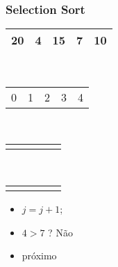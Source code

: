 \documentclass{beamer}
\begin{document}
\begin{frame}
    \frametitle{Selection Sort}
    \begin{center}
        \begin{table}
            \begin{tabular}{| p{0.25cm} | p{0.25cm} | p{0.25cm} | p{0.25cm} | p{0.25cm} |}
                \hline
                20 & 4 & 15 & 7 & 10 \\ \hline
            \end{tabular} \\
            \begin{tabular}{p{0.25cm} p{0.25cm} p{0.25cm} p{0.25cm} p{0.25cm}}
                0 & 1 & 2 & 3 & 4
            \end{tabular} \\
            \begin{tabular}{p{0.25cm} p{0.25cm} p{0.25cm} p{0.25cm} p{0.25cm}}
                \color{blue}{$\uparrow$} & & & \color{red}{$\uparrow$} &
            \end{tabular} \\
            \begin{tabular}{p{0.25cm} p{0.25cm} p{0.25cm} p{0.25cm} p{0.25cm}}
                \color{blue}{i} & & & \color{red}{j} &
            \end{tabular}
        \end{table}
	\end{center}
    \color{green}{$troca = 1$}
    \begin{itemize}[<+->]
        \item $j = j + 1$;
        \item $4 > 7$ ? Não
        \item próximo
    \end{itemize}
\end{frame}
\end{document}
